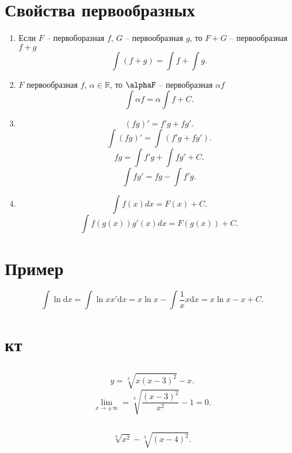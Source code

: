 \documentclass[a4paper]{scrartcl}
\begin{document}
\section{Свойства первообразных}
\begin{enumerate}
    \item Если $F$ -- первоборазная  $f$,  $G$ -- первообразная  $g$, то  $F + G$ -- первообразная $f + g$
        \[
        \int (f + g) = \int f + \int g
        .\] 
    \item $F$ первообразная  $f$,  $\alpha \in \mathbb{R}$, то $\alphaF$ -- первобразная  $\alpha f$
        \[
        \int \alpha f = \alpha \int f + C
        .\] 
    \item
        \[
            (fg)' = f'g + fg'
        .\] 
        \[
        \int (fg)' = \int(f'g + fg') 
        .\] 
        \[
        fg = \int f'g + \int f g' + C
        .\] 
        \[
        \int f g' =  fg - \int f' g
        . \] 
\item
    \[
    \int f(x) dx = F(x) + C
    .\] 
    \[
    \int f(g(x))g'(x) dx = F(g(x)) + C
    .\] 
\end{enumerate}
\section{Пример}
\[
    \int \ln \mathrm{d} x = \int \ln{x} x' \mathrm{d} x = 
    x\ln{x} - \int \frac{1}{x} x \mathrm{d}x  = x\ln{x} - x + C
.\] 
\section{кт}
\subsection{}
\[
    y = \sqrt[3]{x(x - 3)^2}  -x
.\] 
\[
    \lim_{x \to \pm \infty} = \sqrt[3]{\frac{(x - 3)^2}{x^2}}  -1 = 0
.\] 
\subsection{}
\[
    \sqrt[3]{x^2} - \sqrt[3]{(x - 4)^2} 
.\] 
\end{document}

